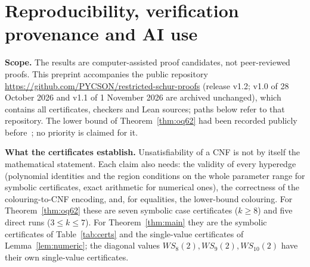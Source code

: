 \documentclass[11pt]{amsart}
\theoremstyle{definition}
\begin{document}
\appendix
\section{Reproducibility, verification provenance and AI use}\label{app:repro-ai}



\smallskip\noindent\textbf{Scope.} The results are computer-assisted proof candidates, not peer-reviewed proofs. This preprint accompanies the public repository \url{https://github.com/PYCSON/restricted-schur-proofs} (release v1.2; v1.0 of 28 October 2026 and v1.1 of 1 November 2026 are archived unchanged), which contains all certificates, checkers and Lean sources; paths below refer to that repository. The lower bound of Theorem~\ref{thm:oq62} had been recorded publicly before~\cite{omega}; no priority is claimed for it.


\smallskip\noindent\textbf{What the certificates establish.} Unsatisfiability of a CNF is not by itself the mathematical statement. Each claim also needs: the validity of every hyperedge (polynomial identities and the region conditions on the whole parameter range for symbolic certificates, exact arithmetic for numerical ones), the correctness of the colouring-to-CNF encoding, and, for equalities, the lower-bound colouring. For Theorem~\ref{thm:oq62} these are seven symbolic case certificates ($k\ge8$) and five direct runs ($3\le k\le7$). For Theorem~\ref{thm:main} they are the symbolic certificates of Table~\ref{tab:certs} and the single-value certificates of Lemma~\ref{lem:numeric}; the diagonal values $WS_8(2),WS_9(2),WS_{10}(2)$ have their own single-value certificates.
\end{document}

